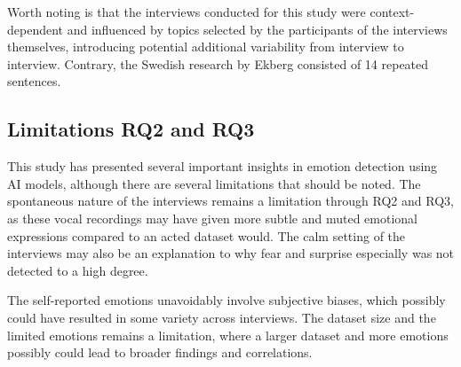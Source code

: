 Worth noting is that the interviews conducted for this study were context-dependent and influenced by topics selected by the participants of the interviews themselves, introducing potential additional variability from interview to interview. Contrary, the Swedish research by Ekberg consisted of 14 repeated sentences.

\subsection{Limitations RQ2 and RQ3}
This study has presented several important insights in emotion detection using AI models, although there are several limitations that should be noted.
The spontaneous nature of the interviews remains a limitation through RQ2 and RQ3, as these vocal recordings may have given more subtle and muted emotional expressions compared to an acted dataset would. The calm setting of the interviews may also be an explanation to why fear and surprise especially was not detected to a high degree.

The self-reported emotions unavoidably involve subjective biases, which possibly could have resulted in some variety across interviews. 
The dataset size and the limited emotions remains a limitation, where a larger dataset and more emotions possibly could lead to broader findings and correlations.
